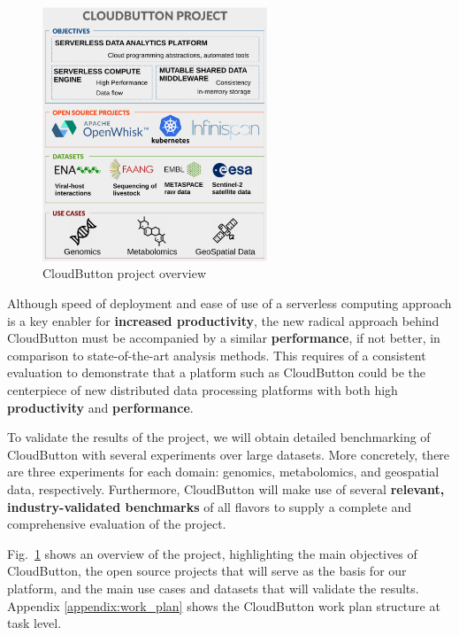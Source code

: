 \documentclass[a4paper,11pt]{article}
\newcommand{\proj}{CloudButton\xspace}
\begin{document}
\begin{figure}[ht]
\centering
\includegraphics[width=0.6\textwidth]{figures/CLOUDBUTTON_project_figure}
\caption{\proj project overview}
\label{fig:project_overview}
\end{figure}	
	
Although  speed of deployment and ease of use of a serverless  computing approach is a key enabler for \textbf{increased productivity},  the new radical approach behind
	\proj must be accompanied by a similar\textbf{ performance}, if not better,   in comparison to state-of-the-art analysis methods.  This requires of a consistent evaluation to
		demonstrate that a platform such as \proj could be the centerpiece of new distributed data processing platforms with both  high \textbf{productivity} and  \textbf{performance}.
		
	
To validate the results of the project, we will obtain detailed benchmarking  of \proj with several experiments over large datasets.  More concretely, there are three experiments for each domain: genomics, metabolomics, and geospatial data, respectively. Furthermore, \proj will make use of several \textbf{relevant, industry-validated benchmarks} of all flavors to supply a complete and comprehensive evaluation of the project. 


Fig.~\ref{fig:project_overview} shows an overview of the project, highlighting the main objectives of \proj, the open source projects that will serve as the basis for our platform, and the main use cases and datasets that will validate the results. Appendix \ref{appendix:work_plan} shows the \proj work plan structure at task level.
\end{document}
